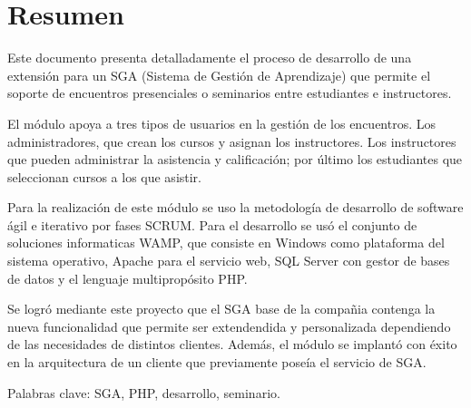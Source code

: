 \chapter*{Resumen}

Este documento presenta detalladamente el proceso de desarrollo de una extensión para un SGA (Sistema de Gestión de Aprendizaje) que permite el soporte de encuentros presenciales o seminarios entre estudiantes e instructores. 

El módulo apoya a tres tipos de usuarios en la gestión de los encuentros. Los administradores, que crean los cursos y asignan los instructores. Los instructores que pueden administrar la asistencia y calificación; por último los estudiantes que seleccionan cursos a los que asistir.

Para la realización de este módulo se uso la metodología de desarrollo de software ágil e iterativo por fases SCRUM. Para el desarrollo se usó el conjunto de soluciones informaticas WAMP, que consiste en Windows como plataforma del sistema operativo, Apache para el servicio web, SQL Server con gestor de bases de datos y el lenguaje multipropósito PHP.

Se logró mediante este proyecto que el SGA base de la compañia contenga la nueva funcionalidad que permite ser extendendida y personalizada dependiendo de las necesidades de distintos clientes. Además, el módulo se implantó con éxito en la arquitectura de un cliente que previamente poseía el servicio de SGA.

Palabras clave: SGA, PHP, desarrollo, seminario.




